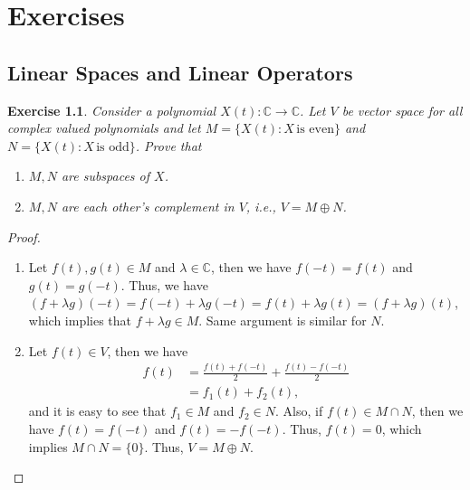 \documentclass[11pt]{book}
\newtheorem{exercise}{Exercise}[section]
\theoremstyle{definition}
\numberwithin{equation}{chapter}
\begin{document}
\medskip















\chapter{Exercises}

\section{Linear Spaces and Linear Operators}
\begin{exercise}\label{ex_1}
Consider a polynomial $X(t):\mathbb{C}\to\mathbb{C}$. Let $V$ be vector space for all complex valued polynomials and let $M = \{X(t): X \,\text{is even}\}$ and $N = \{X(t): X \,\text{is odd}\}$. Prove that 
\begin{enumerate}[label=(\alph*)]
    \item $M,N$ are subspaces of $X$.
    \item $M, N$ are each other's complement in $V$, i.e., $V = M\oplus N$.
\end{enumerate}
\end{exercise}
\begin{proof}
~\begin{enumerate}[label=(\alph*)]
    \item Let $f(t), g(t)\in M$ and $\lambda\in\mathbb{C}$, then we have $f(-t) = f(t)$ and $g(t) = g(-t)$. Thus, we have $(f+\lambda g)(-t) = f(-t) + \lambda g(-t) = f(t) + \lambda g(t) = (f+\lambda g)(t)$, which implies that $f+\lambda g\in M$. Same argument is similar for $N$.
    \item Let $f(t)\in V$, then we have 
    \begin{align*}
        f(t) & = \frac{f(t) + f(-t)}{2} + \frac{f(t) - f(-t)}{2} \\
        & = f_1(t) + f_2(t),
    \end{align*}
    and it is easy to see that $f_1\in M$ and $f_2\in N$. Also, if $f(t)\in M\cap N$, then we have $f(t) = f(-t)$ and $f(t) = -f(-t)$. Thus, $f(t) = 0$, which implies $M\cap N = \{0\}$. Thus, $V = M\oplus N$.
\end{enumerate}
\end{proof}

\medskip
\end{document}
